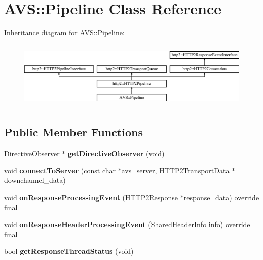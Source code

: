 \hypertarget{classAVS_1_1Pipeline}{}\section{A\+VS\+:\+:Pipeline Class Reference}
\label{classAVS_1_1Pipeline}
Inheritance diagram for A\+VS\+:\+:Pipeline\+:\begin{figure}[H]
\begin{center}
\leavevmode
\includegraphics[height=3.274854cm]{d3/d60/classAVS_1_1Pipeline}
\end{center}
\end{figure}
\subsection*{Public Member Functions}
\begin{DoxyCompactItemize}
\item 
\mbox{\label{classAVS_1_1Pipeline_ab8688a29f69872ed39e0527d0b5013f5}} 
\hyperlink{classdirective_1_1DirectiveObserver}{Directive\+Observer} $\ast$ {\bfseries get\+Directive\+Observer} (void)
\item 
\mbox{\label{classAVS_1_1Pipeline_a6bef9e600c6b61e129cd7c29e8a1a79a}} 
void {\bfseries connect\+To\+Server} (const char $\ast$avs\+\_\+server, \hyperlink{classhttp2_1_1HTTP2TransportData}{H\+T\+T\+P2\+Transport\+Data} $\ast$downchannel\+\_\+data)
\item 
\mbox{\label{classAVS_1_1Pipeline_acb98b0a94987ffd1a057394e90f95a68}} 
void {\bfseries on\+Response\+Processing\+Event} (\hyperlink{classhttp2_1_1HTTP2Response}{H\+T\+T\+P2\+Response} $\ast$response\+\_\+data) override final
\item 
\mbox{\label{classAVS_1_1Pipeline_a393e53bdf76d5a8bdbfc16f0efc3e389}} 
void {\bfseries on\+Response\+Header\+Processing\+Event} (Shared\+Header\+Info info) override final
\item 
\mbox{\label{classAVS_1_1Pipeline_ae2420a57a13ce64cf9ed0b87e48c9c0a}} 
bool {\bfseries get\+Response\+Thread\+Status} (void)
\end{DoxyCompactItemize}
